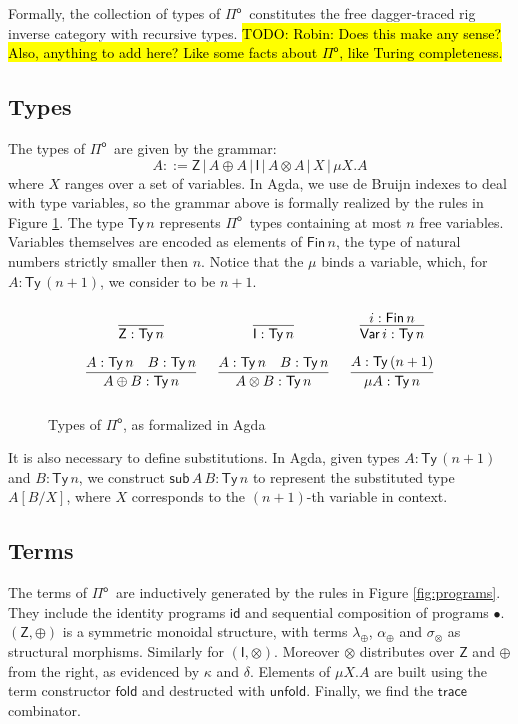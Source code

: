 \documentclass[runningheads,a4paper]{llncs}
\newcommand{\Pio}{\ensuremath{\mathsf{\Pi}^{\mathsf{o}}}}
\newcommand{\Ty}{\mathsf{Ty}}
\newcommand{\Var}{\mathsf{Var}}
\newcommand{\id}{\mathsf{id}}
\newcommand{\fold}{\mathsf{fold}}
\newcommand{\unfold}{\mathsf{unfold}}
\newcommand{\sub}{\mathsf{sub}}
\newcommand{\trace}{\ensuremath{\mathsf{trace}}}
\newcommand{\Z}{\mathsf{Z}}
\newcommand{\I}{\mathsf{I}}
\newcommand{\todo}[1]{\hl{TODO: #1}}
\begin{document}
Formally, the collection of types of \Pio\ constitutes the free
dagger-traced rig inverse category with recursive types. \todo{Robin: Does
  this make any sense? Also, anything to add here? Like some facts
  about \Pio, like Turing completeness.}

\subsection{Types}

The types of \Pio\ are given by the grammar:
\[
A ::= \Z \, | \,A \oplus A \, | \,\I \,| \,A \otimes A \,| \,X \,|
\,\mu X.A 
\]
where $X$ ranges over a set of variables. In Agda, we use de Bruijn
indexes to deal with type variables, so the grammar above is formally
realized by the rules in Figure \ref{fig:types}. The type $\Ty\,n$
represents \Pio\ types containing at most $n$ free
variables. Variables themselves are encoded as elements of
$\mathsf{Fin}\,n$, the type of natural numbers strictly smaller then
$n$. Notice that the $\mu$ binds a variable, which, for $A : \Ty\,(n +
1)$, we consider to be $n + 1$.

\begin{figure}
\[
\arraycolsep=8pt\def\arraystretch{2.8}
\begin{array}{ccc}
\infer{\Z : \Ty\,n}{} 
& \infer{\I : \Ty\,n}{}
& \infer{\Var\,i : \Ty\,n}{i : \mathsf{Fin}\,n}  \\
\infer{A \oplus B : \Ty\,n}{A : \Ty\,n & B : \Ty\,n}
& \infer{A \otimes B : \Ty\,n}{A : \Ty\,n & B : \Ty\,n}
& \infer{\mu A : \Ty\,n}{A : \Ty\,(n+1)} 
\end{array}
\]
\caption{Types of \Pio, as formalized in Agda}
\label{fig:types}
\end{figure}

It is also necessary to define substitutions. In Agda, given
types $A : \Ty\,(n+1)$ and $B : \Ty\,n$, we construct
$\sub\,A\,B : \Ty\,n$ to represent the substituted type $A[B/X]$,
where $X$ corresponds to the $(n+1)$-th variable in context.



\subsection{Terms}

The terms of \Pio\ are inductively generated by the rules in Figure
\ref{fig:programs}. They include the identity programs $\id$ and
sequential composition of programs $\bullet$. $(\Z,\oplus)$ is a
symmetric monoidal structure, with terms $\lambda_\oplus$,
$\alpha_\oplus$ and $\sigma_\otimes$ as structural
morphisms. Similarly for $(\I,\otimes)$. Moreover $\otimes$
distributes over $\Z$ and $\oplus$ from the right, as evidenced by  $\kappa$
and $\delta$. Elements of $\mu X.A$ are built using the term
constructor $\fold$ and destructed with $\unfold$. Finally, we find the
$\trace$ combinator. 
\end{document}
